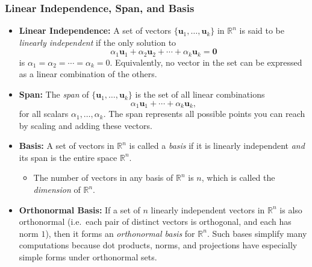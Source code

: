 \subsubsection{Linear Independence, Span, and Basis}
\begin{itemize}
\item \textbf{Linear Independence:}
      A set of vectors $\{\mathbf{u}_1, \dots, \mathbf{u}_k\}$ in $\mathbb{R}^n$ is said to be 
      \emph{linearly independent} if the only solution to
      \[
         \alpha_1 \mathbf{u}_1 + \alpha_2 \mathbf{u}_2 + \cdots + \alpha_k \mathbf{u}_k 
         = \mathbf{0}
      \]
      is $\alpha_1 = \alpha_2 = \cdots = \alpha_k = 0$. 
      Equivalently, no vector in the set can be expressed as a linear combination of the others.
\item \textbf{Span:}
      The \emph{span} of $\{\mathbf{u}_1, \dots, \mathbf{u}_k\}$ is the set of all linear combinations
      \[
         \alpha_1 \mathbf{u}_1 + \cdots + \alpha_k \mathbf{u}_k,
      \]
      for all scalars $\alpha_1, \dots, \alpha_k$. The span represents all possible points 
      you can reach by scaling and adding these vectors.
\item \textbf{Basis:}
      A set of vectors in $\mathbb{R}^n$ is called a \emph{basis} if it is linearly independent 
      \emph{and} its span is the entire space $\mathbb{R}^n$. 
      \begin{itemize}
         \item The number of vectors in any basis of $\mathbb{R}^n$ is $n$, which is called 
               the \emph{dimension} of $\mathbb{R}^n$.
      \end{itemize}
\item \textbf{Orthonormal Basis:}
      If a set of $n$ linearly independent vectors in $\mathbb{R}^n$ is also orthonormal 
      (i.e.\ each pair of distinct vectors is orthogonal, and each has norm $1$), 
      then it forms an \emph{orthonormal basis} for $\mathbb{R}^n$. 
      Such bases simplify many computations because dot products, norms, 
      and projections have especially simple forms under orthonormal sets.
\end{itemize}

